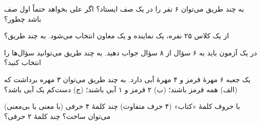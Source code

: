 \begin{exercise}
به چند طریق می‌توان ۶ نفر را در یک صف ایستاد؟ اگر علی بخواهد حتماً اول صف باشد چطور؟
\end{exercise}

\begin{exercise}
از یک کلاس ۲۵ نفره، یک نماینده و یک معاون انتخاب می‌شود. به چند طریق؟
\end{exercise}

\begin{exercise}
در یک آزمون باید به ۶ سؤال از ۸ سؤال جواب دهید. به چند طریق می‌توانید سؤال‌ها را انتخاب کنید؟
\end{exercise}

\begin{exercise}
یک جعبه ۶ مهرهٔ قرمز و ۴ مهرهٔ آبی دارد. به چند طریق می‌توان ۳ مهره برداشت که (الف) همه قرمز باشند؛ (ب) ۲ قرمز و ۱ آبی باشند؛ (ج) دست‌کم یک آبی باشد؟
\end{exercise}

\begin{exercise}
با حروف کلمهٔ «کتاب» (۴ حرف متفاوت) چند کلمهٔ ۴ حرفی (با معنی یا بی‌معنی) می‌توان ساخت؟ چند کلمهٔ ۲ حرفی؟
\end{exercise}
